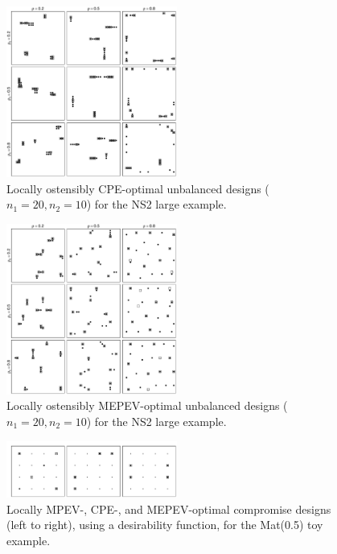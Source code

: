 \documentclass[12pt]{article}
\begin{document}
        \begin{figure}
        \begin{center}
        \includegraphics[width=0.5\textwidth]{saacovest_NS2_imbalanced.pdf}
        \caption{Locally ostensibly CPE-optimal unbalanced designs ($n_1=20,n_2=10$) for the NS2 large example.}
        \end{center}
        \end{figure}

        \begin{figure}
        \begin{center}
        \includegraphics[width=0.5\textwidth]{saaeblup_NS2_imbalanced.pdf}
        \caption{Locally ostensibly MEPEV-optimal unbalanced designs ($n_1=20,n_2=10$) for the NS2 large example.}
        \end{center}
        \end{figure}

        \begin{figure}
        \begin{center}
        \includegraphics[width=0.5\textwidth]{desirability.pdf}
        \caption{Locally MPEV-, CPE-, and MEPEV-optimal compromise designs (left to right), using a desirability function, for the Mat(0.5) toy example.}
        \end{center}
        \end{figure}
\end{document}
